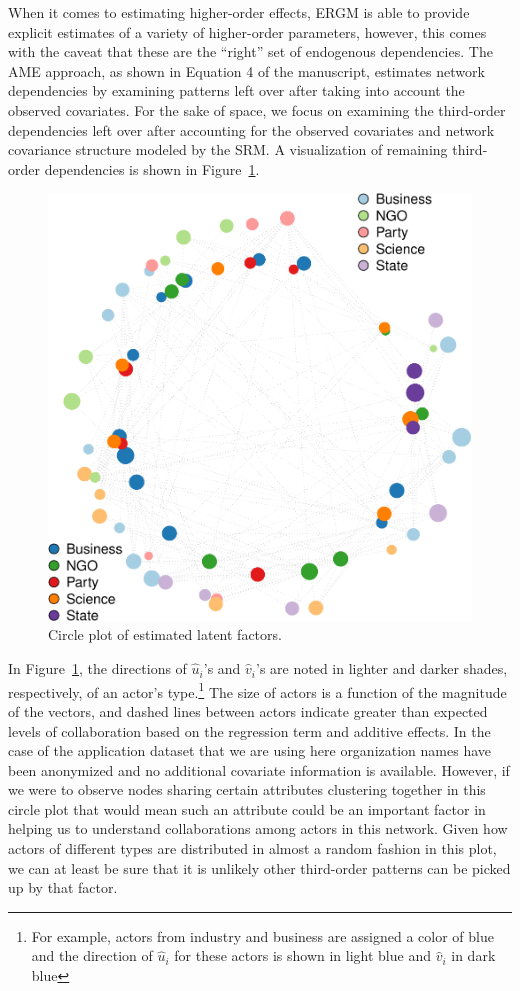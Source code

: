 \documentclass[12pt,pdflatex]{elsarticle}
\begin{document}
When it comes to estimating higher-order effects, ERGM is able to provide explicit estimates of a variety of higher-order parameters, however, this comes with the caveat that these are the ``right'' set of endogenous dependencies. The AME approach, as shown in Equation 4 of the manuscript, estimates network dependencies by examining patterns left over after taking into account the observed covariates. For the sake of space, we focus on examining the third-order dependencies left over after accounting for the observed covariates and network covariance structure modeled by the SRM. A visualization of remaining third-order dependencies is shown in Figure~\ref{fig:uv}.

\begin{figure}[ht]
\centering
	\includegraphics[width=.5\textwidth]{ameFitSR_2_UV}
	\caption{Circle plot of estimated latent factors.}
	\label{fig:uv}
\end{figure}
\FloatBarrier

In Figure~\ref{fig:uv}, the directions of $\hat{u}_{i}$'s and $\hat{v}_{i}$'s are noted in lighter and darker shades, respectively, of an actor's type.\footnote{For example, actors from industry and business are assigned a color of blue and the direction of $\hat{u}_{i}$ for these actors is shown in light blue and $\hat{v}_{i}$ in dark blue} The size of actors is a function of the magnitude of the vectors, and dashed lines between actors indicate greater than expected levels of collaboration based on the regression term and additive effects. In the case of the application dataset that we are using here organization names have been anonymized and no additional covariate information is available. However, if we were to observe nodes sharing certain attributes clustering together in this circle plot that would mean such an attribute could be an important factor in helping us to understand collaborations among actors in this network. Given how actors of different types are distributed in almost a random fashion in this plot, we can at least be sure that it is unlikely other third-order patterns can be picked up by that factor.
\end{document}
